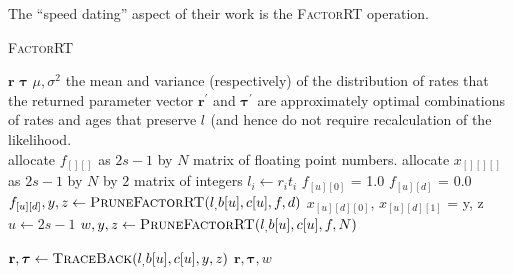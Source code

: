 \documentclass{llncs}
\newcommand{\numLeaves}[0]{\ensuremath{s}\xspace}
\newcommand{\edgeLen}[1]{\ensuremath{l_{#1}}\xspace}
\newcommand{\rate}[1]{\ensuremath{r_{#1}}\xspace}
\newcommand{\ratevec}[0]{\ensuremath{\mathbf{r}}\xspace}
\newcommand{\duration}[1]{\ensuremath{t_{#1}}\xspace}
\newcommand{\agevec}[0]{\ensuremath{\boldsymbol{\tau}}\xspace}
\newcommand{\firstChild}[1]{\ensuremath{b[{#1}]}\xspace}
\newcommand{\secondChild}[1]{\ensuremath{c[{#1}]}\xspace}
\newcommand{\subtreeOptFactor}[2]{\ensuremath{f_{[{#1}][{#2}]}}\xspace}
\newcommand{\optChildAges}[3]{\ensuremath{x_{[{#1}][{#2}][{#3}]}}\xspace}
\newcommand{\numAges}[0]{\ensuremath{N}\xspace}
\begin{document}
The ``speed dating'' aspect of their work is the \textsc{FactorRT} operation.
\begin{algorithm} \caption{\textsc{FactorRT}}\label{factorRT}
\begin{algorithmic}
\REQUIRE $\ratevec$
\REQUIRE $\agevec$
\REQUIRE $\mu, \sigma^2$ the mean and variance (respectively) of the distribution of rates
\ENSURE that the returned parameter vector $\ratevec^{\prime}$ and $\agevec^{\prime}$ are
approximately optimal combinations of rates and ages that preserve $\edgeLen{}$ (and hence 
do not require recalculation of the likelihood.\\
\STATE allocate \subtreeOptFactor{}{} as $2\numLeaves -1$ by $\numAges$ matrix of floating point numbers.
\STATE allocate \optChildAges{}{}{} as $2\numLeaves -1$ by $\numAges$ by $2$ matrix of integers
\FOR{$i \in \left[0, 1, \ldots, 2\numLeaves - 1\right)$}
    \STATE $\edgeLen{i} \leftarrow  \rate{i} \duration{i}$
\ENDFOR
{}
    \STATE \subtreeOptFactor{u}{0} = 1.0
    \FOR{$d \in [1, 2, \ldots, \numAges)$ }
        \STATE \subtreeOptFactor{u}{d} = 0.0
    \ENDFOR
\ENDFOR \\
    \FOR{$d \in [1, 2, \ldots, \numAges)$ }
        \STATE $\subtreeOptFactor{u}{d}, y, z \leftarrow \mbox{\textsc{PruneFactorRT}}(\edgeLen, \firstChild{u}, \secondChild{u}, f, d)$
        \STATE \optChildAges{u}{d}{0}, \optChildAges{u}{d}{1} = y, z
    \ENDFOR
\ENDFOR
\STATE $u\leftarrow 2\numLeaves - 1$ 
\STATE $w, y, z \leftarrow  \mbox{\textsc{PruneFactorRT}}(\edgeLen, \firstChild{u}, \secondChild{u}, f, \numAges)$

\STATE $\ratevec, \agevec \leftarrow \mbox{\textsc{TraceBack}}(\edgeLen, \firstChild{u}, \secondChild{u}, y, z)$
\RETURN $\ratevec, \agevec, w$
\end{algorithmic}
\end{algorithm}
\end{document}
